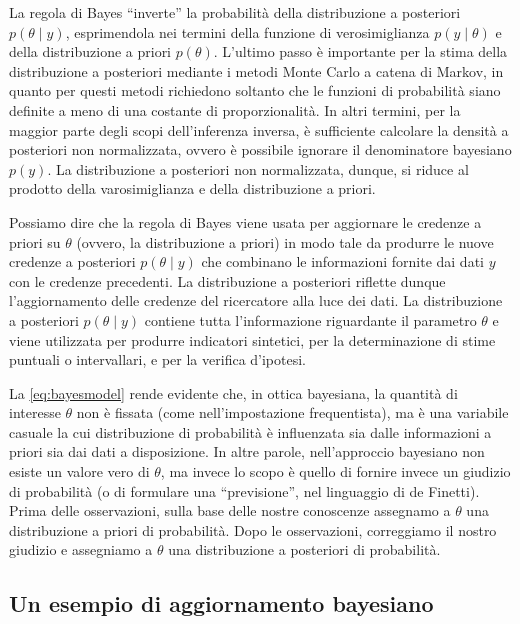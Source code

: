 \documentclass[
  10pt,
  italian,
  a4paper,
  extrafontsizes,onecolumn,openright
  ]{memoir}
\theoremstyle{definition}
\theoremstyle{definition}
\theoremstyle{definition}
\theoremstyle{definition}
\theoremstyle{remark}
\begin{document}
La regola di Bayes ``inverte'' la probabilità della distribuzione a posteriori \(p(\theta \mid y)\), esprimendola nei termini della funzione di verosimiglianza \(p(y \mid \theta)\) e della distribuzione a priori \(p(\theta)\). L'ultimo passo è importante per la stima della distribuzione a posteriori mediante i metodi Monte Carlo a catena di Markov, in quanto per questi metodi richiedono soltanto che le funzioni di probabilità siano definite a meno di una costante di proporzionalità. In altri termini, per la maggior parte degli scopi dell'inferenza inversa, è sufficiente calcolare la densità a posteriori non normalizzata, ovvero è possibile ignorare il denominatore bayesiano \(p(y)\). La distribuzione a posteriori non normalizzata, dunque, si riduce al prodotto della varosimiglianza e della distribuzione a priori.

Possiamo dire che la regola di Bayes viene usata per aggiornare le credenze a priori su \(\theta\) (ovvero, la distribuzione a priori) in modo tale da produrre le nuove credenze a posteriori \(p(\theta \mid y)\) che combinano le informazioni fornite dai dati \(y\) con le credenze precedenti. La distribuzione a posteriori riflette dunque l'aggiornamento delle credenze del ricercatore alla luce dei dati. La distribuzione a posteriori \(p(\theta \mid y)\) contiene tutta l'informazione riguardante il parametro \(\theta\) e viene utilizzata per produrre indicatori sintetici, per la determinazione di stime puntuali o intervallari, e per la verifica d'ipotesi.

La \eqref{eq:bayesmodel} rende evidente che, in ottica bayesiana, la quantità di interesse \(\theta\) non è fissata (come nell'impostazione frequentista), ma è una variabile casuale la cui distribuzione di probabilità è influenzata sia dalle informazioni a priori sia dai dati a disposizione. In altre parole, nell'approccio bayesiano non esiste un valore vero di \(\theta\), ma invece lo scopo è quello di fornire invece un giudizio di probabilità (o di formulare una ``previsione'', nel linguaggio di de Finetti). Prima delle osservazioni, sulla base delle nostre conoscenze assegnamo a \(\theta\) una distribuzione a priori di probabilità. Dopo le osservazioni, correggiamo il nostro giudizio e assegniamo a \(\theta\) una distribuzione a posteriori di probabilità.

\hypertarget{un-esempio-di-aggiornamento-bayesiano}{%
\subsection{Un esempio di aggiornamento bayesiano}\label{un-esempio-di-aggiornamento-bayesiano}}
\end{document}
